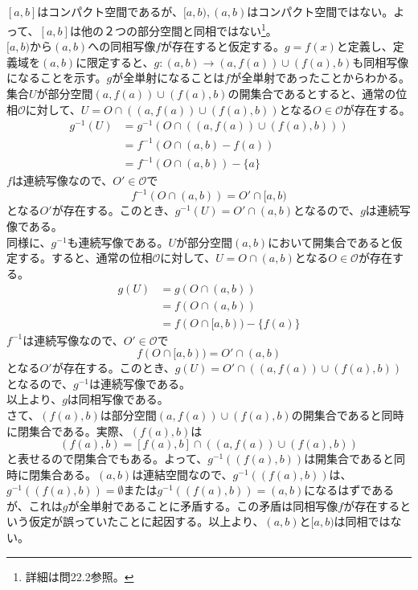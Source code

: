 \documentclass{jsarticle}
\begin{document}
\subsection{}
$[a,b]$はコンパクト空間であるが、$[a,b),(a,b)$はコンパクト空間ではない。よって、$[a,b]$は他の２つの部分空間と同相ではない\footnote{詳細は問22.2参照。}。\\
$[a,b)$から$(a,b)$への同相写像$f$が存在すると仮定する。$g=f(x)$と定義し、定義域を$(a,b)$に限定すると、$g:(a,b)\rightarrow (a,f(a))\cup(f(a),b)$も同相写像になることを示す。$g$が全単射になることは$f$が全単射であったことからわかる。集合$U$が部分空間$(a,f(a))\cup(f(a),b)$の開集合であるとすると、通常の位相$\mathcal{O}$に対して、$U=O\cap((a,f(a))\cup(f(a),b))$となる$O\in\mathcal{O}$が存在する。
\begin{align*}
g^{-1}(U)&=g^{-1}(O\cap((a,f(a))\cup(f(a),b)))\\
&=f^{-1}(O\cap(a,b)-f(a))\\
&=f^{-1}(O\cap(a,b))-\{a\}
\end{align*}
$f$は連続写像なので、$O'\in\mathcal{O}$で
\[f^{-1}(O\cap(a,b))=O'\cap[a,b)\]
となる$O'$が存在する。このとき、$g^{-1}(U)=O'\cap(a,b)$となるので、$g$は連続写像である。\\
同様に、$g^{-1}$も連続写像である。$U$が部分空間$(a,b)$において開集合であると仮定する。すると、通常の位相$\mathcal{O}$に対して、$U=O\cap(a,b)$となる$O\in\mathcal{O}$が存在する。
\begin{align*}
g(U)&=g(O\cap(a,b))\\
&=f(O\cap(a,b))\\
&=f(O\cap[a,b))-\{f(a)\}
\end{align*}
$f^{-1}$は連続写像なので、$O'\in\mathcal{O}$で
\[f(O\cap[a,b))=O'\cap(a,b)\]
となる$O'$が存在する。このとき、$g(U)=O'\cap((a,f(a))\cup(f(a),b))$となるので、$g^{-1}$は連続写像である。\\
以上より、$g$は同相写像である。\\
さて、$(f(a),b)$は部分空間$(a,f(a))\cup(f(a),b)$の開集合であると同時に閉集合である。実際、$(f(a),b)$は
\[(f(a),b)=[f(a),b]\cap((a,f(a))\cup(f(a),b))\]
と表せるので閉集合でもある。よって、$g^{-1}((f(a),b))$は開集合であると同時に閉集合ある。$(a,b)$は連結空間なので、$g^{-1}((f(a),b))$は、$g^{-1}((f(a),b))=\emptyset$または$g^{-1}((f(a),b))=(a,b)$になるはずであるが、これは$g$が全単射であることに矛盾する。この矛盾は同相写像$f$が存在するという仮定が誤っていたことに起因する。以上より、$(a,b)$と$[a,b)$は同相ではない。



\end{document}

